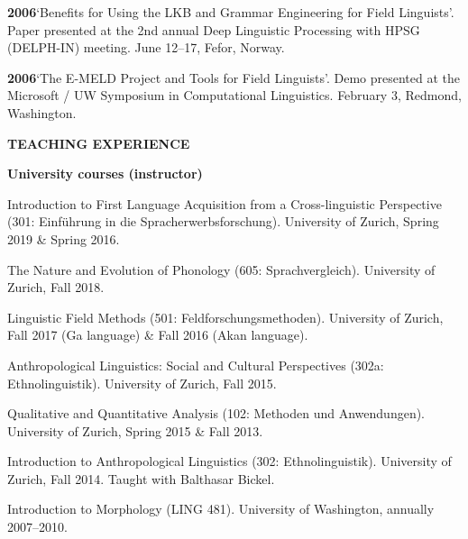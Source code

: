 \documentclass[11pt]{article}
\newcommand{\hangpara}{
 \setlength{\parindent}{0in} %
 \hangindent=0.42in %
}
\begin{document}
\vskip 6pt
\hangpara
{\bf 2006}\hspace{1ex}`Benefits for Using the LKB and Grammar Engineering for Field Linguists'. Paper presented at the 2nd annual Deep Linguistic Processing with HPSG (DELPH-IN) meeting. June 12--17, Fefor, Norway.

\vskip 6pt
\hangpara
{\bf 2006}\hspace{1ex}`The E-MELD Project and Tools for Field Linguists'. Demo presented at the Microsoft / UW Symposium in Computational Linguistics. February 3, Redmond, Washington.


\clearpage
\vskip 20pt
\begin{flushleft}
{\bf TEACHING EXPERIENCE}
\end{flushleft}

\begin{flushleft}
{\bf University courses (instructor)}
\end{flushleft}


\hangpara Introduction to First Language Acquisition from a Cross-linguistic Perspective (301: Einf{\"u}hrung in die Spracherwerbsforschung). University of Zurich, Spring 2019 \& Spring 2016.

\vskip 6pt
\hangpara The Nature and Evolution of Phonology (605: Sprachvergleich). University of Zurich, Fall 2018.

\vskip 6pt
\hangpara Linguistic Field Methods (501: Feldforschungsmethoden). University of Zurich, Fall 2017 (Ga language) \& Fall 2016 (Akan language).

\vskip 6pt
\hangpara Anthropological Linguistics: Social and Cultural Perspectives (302a: Ethnolinguistik). University of Zurich, Fall 2015.

\vskip 6pt
\hangpara Qualitative and Quantitative Analysis (102: Methoden und Anwendungen). University of Zurich, Spring 2015 \& Fall 2013.

\vskip 6pt
\hangpara Introduction to Anthropological Linguistics (302: Ethnolinguistik). University of Zurich, Fall 2014. Taught with Balthasar Bickel.

\vskip 6pt
\hangpara Introduction to Morphology (LING 481). University of Washington, annually 2007--2010.
\end{document}
